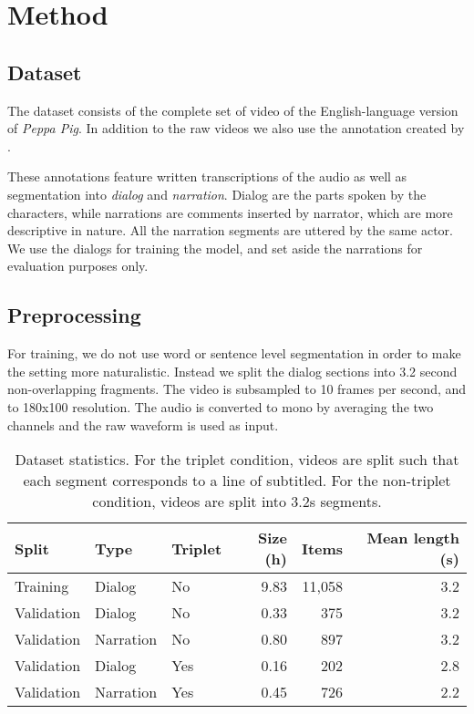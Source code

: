 \section{Method}
\label{sec:method}

\subsection{Dataset}
The dataset consists of the complete set of video of the
English-language version of {\it Peppa Pig}. In addition to the raw
videos we  also use the annotation created by
\citep{papasarantopoulos2021narration}.

These annotations feature written transcriptions of the audio as well
as segmentation into {\it dialog} and {\it narration}. Dialog are the
parts spoken by the characters, while narrations are comments inserted
by narrator, which are more descriptive in nature. All the narration
segments are uttered by the same actor. We use the dialogs for
training the model, and set aside the narrations for evaluation
purposes only.



\subsection{Preprocessing}
For training, we do not use word or sentence level segmentation in
order to make the setting more naturalistic. Instead we split the
dialog sections into 3.2 second non-overlapping fragments. The video
is subsampled to 10 frames per second, and to 180x100 resolution. The
audio is converted to mono by averaging the two channels  and the raw
waveform is used as input.


\begin{table}
  \centering
  \begin{tabular}{lllrrr}
    \toprule
    Split      & Type      & Triplet   & Size (h) & Items & Mean
                                                            length
                                                            (s)\\\midrule
    Training   & Dialog    & No        & 9.83     & 11,058 & 3.2 \\
    Validation & Dialog    & No        & 0.33     & 375    & 3.2 \\
    Validation & Narration & No        & 0.80     & 897    & 3.2 \\
    Validation & Dialog    & Yes       & 0.16     & 202    & 2.8 \\
    Validation & Narration & Yes       & 0.45     & 726    & 2.2 \\
    \bottomrule
  \end{tabular}
  \caption{Dataset statistics. For the triplet condition, videos are
    split such that each segment corresponds to a line of
    subtitled. For the non-triplet condition, videos are split into
    3.2s segments.}
  \label{tab:ds-stat}
\end{table}

